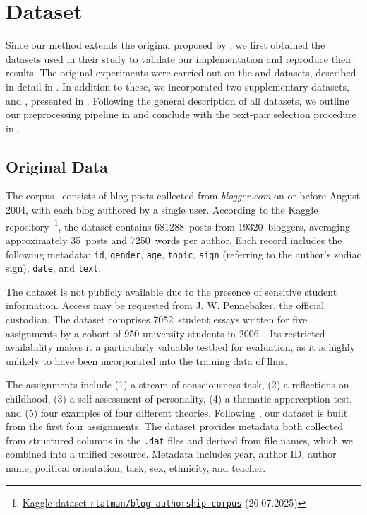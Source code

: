 \section{Dataset}
\label{sec:dataset}

Since our method extends the original \impAppr{} proposed by \citet{koppel_determining_2014}, we first obtained the datasets used in their study to validate our implementation and reproduce their results. 
The original experiments were carried out on the \dataBlog{} and \dataStudent{} datasets, described in detail in .
In addition to these, we incorporated two supplementary datasets, \dataPan{} and \dataGutenberg{}, presented in . 
Following the general description of all datasets, we outline our preprocessing pipeline in  and conclude with the text-pair selection procedure in .


\subsection{Original Data}
\label{subsec:original_data}

The \dataBlog{} corpus~\citep{blog_dataset_2006} consists of blog posts collected from \textit{blogger.com} on or before August 2004, with each blog authored by a single user.
According to the Kaggle repository~\footnote{\href{https://www.kaggle.com/datasets/rtatman/blog-authorship-corpus?resource=download}{Kaggle dataset \texttt{rtatman/blog-authorship-corpus}} (26.07.2025)}, the dataset contains \num{681288}~posts from \num{19320}~bloggers, averaging approximately 35~posts and \num{7250}~words per author.
Each record includes the following metadata: \texttt{id}, \texttt{gender}, \texttt{age}, \texttt{topic}, 
\texttt{sign} (referring to the author's zodiac sign), \texttt{date}, and \texttt{text}.

The \dataStudent{} dataset is not publicly available due to the presence of sensitive student information. 
Access may be requested from J. W. Pennebaker, the official custodian.
The dataset comprises \num{7052}~student essays written for five assignments by a cohort of 950 university students in 2006~\citep{koppel_determining_2014}.
Its restricted availability makes it a particularly valuable testbed for evaluation, as it is highly unlikely to have been incorporated into the training data of \acp{llm}.

The assignments include (1) a stream-of-consciousness task, (2) a reflections on childhood, (3) a self-assessment of personality, (4) a thematic apperception test, and (5) four examples of four different theories.
Following \citet{koppel_determining_2014}, our dataset is built from the first four assignments. 
The dataset provides metadata both collected from structured columns in the \texttt{.dat} files and derived from file names, which we combined into a unified resource. 
Metadata includes year, author ID, author name, political orientation, task, sex, ethnicity, and teacher.


